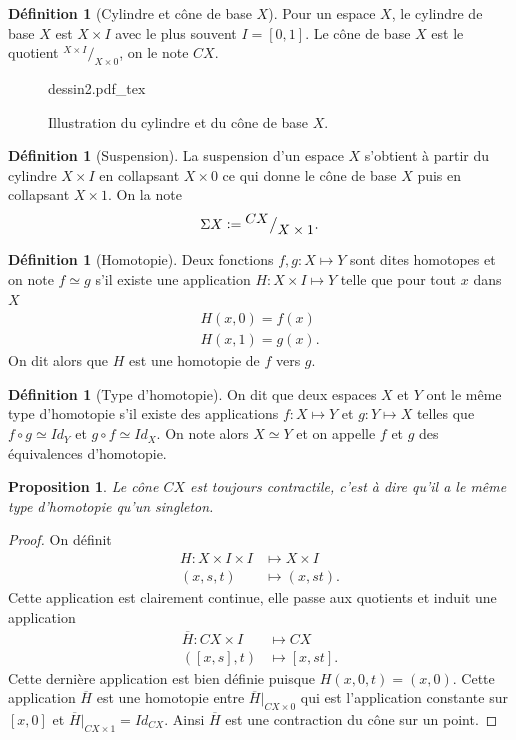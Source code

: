 \documentclass[12pt]{book}
\newcommand{\defeq}{\vcentcolon=}
\newcommand{\incfig}[1]{%
    \def\svgwidth{\columnwidth}
    {#1.pdf_tex} 
}
\newtheorem{prop}[lemma]{Proposition}
\theoremstyle{definition}
\newtheorem{definition}[lemma]{Définition}
\theoremstyle{remark}
\newcommand*\quot[2]{{^{\textstyle #1}\big/_{\textstyle #2}}}
\begin{document}
	\begin{definition}[Cylindre et cône de base $X$]
		Pour un espace $X$, le cylindre de base $X$ est $X \times I$ avec le plus souvent $I = [0,1]$.
		Le cône de base $X$ est le quotient $\quot{X\times I}{X \times 0}$, on le note $CX$.
	\end{definition}

	\begin{figure}[!ht]
	    \centering
	    \incfig{dessin2}
	    \caption{Illustration du cylindre et du cône de base $X$.}
	\end{figure}

	\begin{definition}[Suspension]
		La suspension d'un espace $X$ s'obtient à partir du cylindre $X \times I$ en collapsant $X \times 0$ ce qui donne le cône de base $X$ puis en collapsant $X \times 1$. On la note \[
			\Sigma X \defeq \quot{CX}{X \times 1}
		.\] 	
	\end{definition}

	\begin{definition}[Homotopie]
		Deux fonctions $f,g : X \longmapsto Y$ sont dites homotopes et on note $f \simeq g$ s'il existe une application $H : X \times I \longmapsto Y$ telle que pour tout $x$ dans $X$ 
		\begin{align*}
			H(x,0) = f(x) \\
			H(x,1) = g(x)
		.\end{align*} On dit alors que $H$ est une homotopie de $f$ vers $g$.
	\end{definition}

	\begin{definition}[Type d'homotopie]
		On dit que deux espaces $X$ et $Y$ ont le même type d'homotopie s'il existe des applications $f : X \longmapsto Y$ et $g : Y \longmapsto X$ telles que $f \circ g \simeq Id_Y$ et $g \circ f \simeq Id_X$. On note alors $X \simeq Y$ et on appelle $f$ et $g$ des équivalences d'homotopie.	
	\end{definition}

	\begin{prop}
		Le cône $CX$ est toujours contractile, c'est à dire qu'il a le même type d'homotopie qu'un singleton.	
	\end{prop}
	\begin{proof}
		On définit 
		\begin{align*}
			H : X \times I \times I &\longmapsto X \times I \\
			(x,s,t) &\longmapsto (x,st)
		.\end{align*}
		Cette application est clairement continue, elle passe aux quotients et induit une application
		\begin{align*}
			\overline{H} : CX \times I &\longmapsto CX \\
			([x,s],t) &\longmapsto [x,st]
		.\end{align*}
		Cette dernière application est bien définie puisque $H(x,0,t) = (x,0)$. Cette application  $\overline{H}$ est une homotopie entre $\overline{H} \vert_{CX \times 0}$
		qui est l'application constante sur $[x,0]$ et $\overline{H} \vert _{CX \times 1} = Id_{CX}$.
		Ainsi $\overline{H}$ est une contraction du cône sur un point.
	\end{proof}
\end{document}
